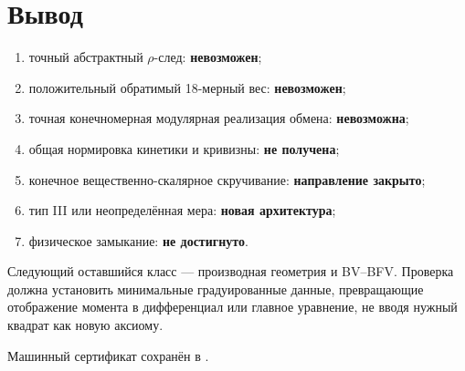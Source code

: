 \section{Вывод}

\begin{protocol}
\begin{enumerate}
 \item точный абстрактный \(\rho\)-след: \textbf{невозможен};
 \item положительный обратимый 18-мерный вес: \textbf{невозможен};
 \item точная конечномерная модулярная реализация обмена:
 \textbf{невозможна};
 \item общая нормировка кинетики и кривизны: \textbf{не получена};
 \item конечное вещественно-скалярное скручивание:
 \textbf{направление закрыто};
 \item тип III или неопределённая мера: \textbf{новая архитектура};
 \item физическое замыкание: \textbf{не достигнуто}.
\end{enumerate}
\end{protocol}

Следующий оставшийся класс --- производная геометрия и BV--BFV. Проверка
 должна установить
минимальные градуированные данные, превращающие отображение момента в
дифференциал или главное уравнение, не вводя нужный квадрат как новую
аксиому.

Машинный сертификат сохранён в
.